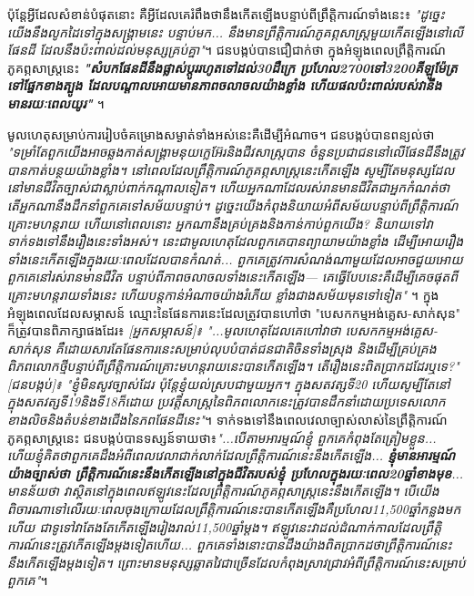 \documentclass[10pt,twocolumn,letterpaper]{article}
\begin{document}
	ប៉ុន្តែអ្វីដែលសំខាន់បំផុតនោះ គឺអ្វីដែលគេរំពឹងថានឹងកើតឡើងបន្ទាប់ពីព្រឹត្តិការណ៍ទាំងនេះ៖ \textit{"ដូច្នេះយើងនឹងលូកដៃទៅក្នុងសង្គ្រាមនេះ បន្ទាប់មក... នឹងមានព្រឹត្តិការណ៍ភូគព្ភសាស្ត្រមួយកើតឡើងនៅលើផែនដី ដែលនឹងប៉ះពាល់ដល់មនុស្សគ្រប់គ្នា"}\cite{4}។ ជនបង្កប់បានជឿជាក់ថា ក្នុងអំឡុងពេលព្រឹត្តិការណ៍ភូគព្ភសាស្ត្រនេះ \textit{\textbf{"សំបកផែនដីនឹងផ្លាស់ប្តូររហូតទៅដល់30ដឺក្រេ ប្រហែល2700ទៅ3200គីឡូម៉ែត្រទៅផ្នែកខាងត្បូង ដែលបណ្តាលអោយមានភាពចលាចលយ៉ាងខ្លាំង ហើយផលប៉ះពាល់របស់វានឹងមានរយៈពេលយូរ" }}\cite{4}។

	មូលហេតុសម្រាប់ការរៀបចំគម្រោងសម្ងាត់ទាំងអស់នេះគឺដើម្បីអំណាច។ ជនបង្កប់បានពន្យល់ថា \textit{"ទម្រាំតែពួកយើងអាចឆ្លងកាត់សង្គ្រាមនុយក្លេអ៊ែរនិងជីវសាស្ត្របាន ចំនួនប្រជាជននៅលើផែនដីនឹងត្រូវបានកាត់បន្ថយយ៉ាងខ្លាំង។ នៅពេលដែលព្រឹត្តិការណ៍ភូគព្ភសាស្ត្រនេះកើតឡើង សូម្បីតែមនុស្សដែលនៅមានជីវិតច្បាស់ជាស្លាប់ពាក់កណ្តាលទៀត។ ហើយអ្នកណាដែលរស់រានមានជីវិតជាអ្នកកំណត់ថា តើអ្នកណានឹងដឹកនាំពួកគេទៅសម័យបន្ទាប់។ ដូច្នេះយើងកំពុងនិយាយអំពីសម័យបន្ទាប់ពីព្រឹត្តិការណ៍គ្រោះមហន្តរាយ ហើយនៅពេលនោះ អ្នកណានឹងគ្រប់គ្រងនិងកាន់កាប់ពួកយើង? និយាយទៅវាទាក់ទងទៅនឹងរឿងនេះទាំងអស់។ នេះជាមូលហេតុដែលពួកគេបានព្យាយាមយ៉ាងខ្លាំង ដើម្បីអោយរឿងទាំងនេះកើតឡើងក្នុងរយៈពេលដែលបានកំណត់... ពួកគេត្រូវការសំណង់ណាមួយដែលអាចជួយអោយពួកគេនៅរស់រានមានជីវិត បន្ទាប់ពីភាពចលាចលទាំងនេះកើតឡើង— គេធ្វើបែបនេះគឺដើម្បីគេចផុតពីគ្រោះមហន្តរាយទាំងនេះ ហើយបន្តកាន់អំណាចយ៉ាងរំភើយ ខ្លាំងជាងសម័យមុនទៅទៀត"} \cite{4}។ ក្នុងអំឡុងពេលដែលសម្ភាសន៍ ឈ្មោះនៃផែនការនេះដែលត្រូវបានហៅថា "បេសកកម្មអង់គ្លេស-សាក់សុន" ក៏ត្រូវបានពិភាក្សាផងដែរ៖ \textit{[អ្នកសម្ភាសន៍]៖ "...មូលហេតុដែលគេហៅវាថា បេសកកម្មអង់គ្លេស-សាក់សុន គឺដោយសារតែផែនការនេះសម្រាប់លុបបំបាត់ជនជាតិចិនទាំងស្រុង និងដើម្បីគ្រប់គ្រងពិភពលោកថ្មី​បន្ទាប់ពីព្រឹត្តិការណ៍គ្រោះមហន្តរាយនេះបានកើតឡើង។  តើរឿងនេះពិតប្រាកដដែរឬទេ?" [ជនបង្កប់]៖ "ខ្ញុំមិនសូវច្បាស់ដែរ ប៉ុន្តែខ្ញុំយល់ស្របជាមួយអ្នក​។ ក្នុងសតវត្សទី20  ហើយសូម្បីតែនៅក្នុងសតវត្សទី19និងទី18ក៏ដោយ ប្រវត្តិសាស្ត្រនៃពិភពលោកនេះត្រូវបានដឹកនាំដោយប្រទេសលោកខាងលិចនិងតំបន់ខាងជើងនៃភពផែនដីនេះ"}\cite{4}។
ទាក់ទងទៅនឹងពេលវេលាច្បាស់លាស់នៃព្រឹត្តិការណ៍ភូគព្ភសាស្ត្រនេះ ជនបង្កប់បានទស្សន៍ទាយថា៖\textit{"...បើតាមអារម្មណ៍ខ្ញុំ ពួកគេកំពុងតែត្រៀមខ្លួន... ហើយខ្ញុំគិតថាពួកគេដឹងអំពីពេលវេលាជាក់លាក់ដែលព្រឹត្តិការណ៍នេះនឹងកើតឡើង... \textbf{ខ្ញុំមានអារម្មណ៍យ៉ាងច្បាស់ថា ​ព្រឹត្តិការណ័នេះនឹងកើតឡើងនៅក្នុងជីវិតរបស់ខ្ញុំ ប្រហែលក្នុងរយៈពេល20ឆ្នាំខាងមុខ}... មានន័យថា វាស្ថិតនៅក្នុងពេលឥឡូវនេះដែលព្រឹត្តិការណ៍ភូគព្ភសាស្ត្រនេះនឹងកើតឡើង។ បើយើងពិចារណាទៅលើរយៈពេលចុងក្រោយដែលព្រឹត្តិការណ៍នេះបានកើតឡើងគឺប្រហែល11,500ឆ្នាំកន្លងមកហើយ ជាទូទៅវាតែងតែកើតឡើងរៀងរាល់11,500ឆ្នាំម្ដង។ ឥឡូវនេះវាដល់ដំណាក់កាលដែលព្រឹតិ្តការណ៍នេះត្រូវកើតឡើងម្តងទៀតហើយ... ពួកគេទាំងនោះបានដឹងយ៉ាងពិតប្រាកដថាព្រឹត្តិការណ៍នេះនឹងកើតឡើងម្តងទៀត។ ព្រោះមានមនុស្សឆ្លាតវៃជាច្រើនដែលកំពុងស្រាវជ្រាវអំពីព្រឹត្តិការណ៍នេះសម្រាប់ពួកគេ"}\cite{4}។
\end{document}
